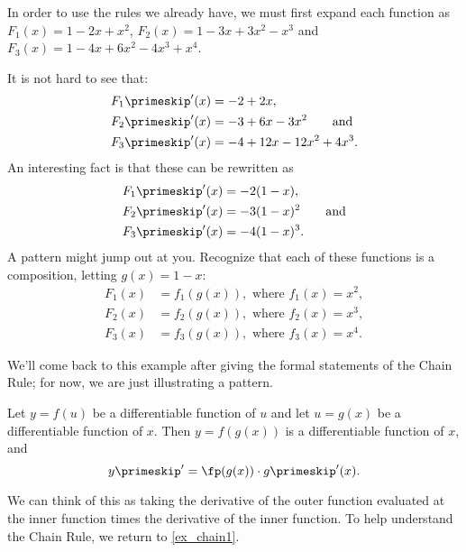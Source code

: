 {In order to use the rules we already have, we must first expand each function as
$F_1(x) = 1 - 2x + x^2$,  $F_2(x) = 1 - 3x + 3x^2 - x^3$ and $F_3(x) = 1 - 4x + 6x^2 - 4x^3 + x^4$.
  
It is not hard to see that:
\begin{align*}
F_1\primeskip'(x) &= -2 + 2x,\\
F_2\primeskip'(x) &= -3 + 6x - 3x^2\qquad\text{and}\\
F_3\primeskip'(x) &= -4 + 12x - 12x^2 + 4x^3.
\end{align*}
An interesting fact is that these can be rewritten as
\begin{align*}
F_1\primeskip'(x) &= -2(1-x),\\
F_2\primeskip'(x) &= -3(1-x)^2\qquad\text{and} \\
F_3\primeskip'(x) &= -4(1-x)^3.
\end{align*}
A pattern might jump out at you.  Recognize that each of these functions is a composition, letting $g(x) = 1-x$:
\begin{align*}
F_1(x) &= f_1(g(x)), \text{ where } f_1(x) = x^2,\\
F_2(x) &= f_2(g(x)), \text{ where } f_2(x) = x^3,\\
F_3(x) &= f_3(g(x)), \text{ where } f_3(x) = x^4.
\end{align*}

We'll come back to this example after giving the formal statements of the Chain Rule; for now, we are just illustrating a pattern.}

\begin{theorem}\label{thm:chain_rule}
Let $y = f(u)$ be a differentiable function of $u$ and let $u = g(x)$ be a differentiable function of $x$. Then $y=f(g(x))$ is a differentiable function of $x$, and \[y\primeskip' = \fp(g(x))\cdot g\primeskip'(x).\]
\end{theorem}

We can think of this as taking the derivative of the outer function evaluated at the inner function times the derivative of the inner function. To help  understand the Chain Rule, we return to \autoref{ex_chain1}.

